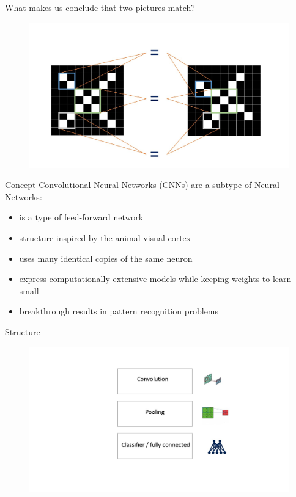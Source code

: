\documentclass[12pt]{beamer}
\begin{document}
\begin{frame}{What makes us conclude that two pictures match?}
\begin{figure}
\includegraphics[width = 0.8\linewidth]{images/features.jpg}
\label{fig:principle}
\end{figure}
\end{frame}


\begin{frame}{Concept}
Convolutional Neural Networks (CNNs) are a subtype of Neural Networks:
  \begin{itemize}
  	\item is a type of feed-forward network
  	\item structure inspired by the animal visual cortex
     \item uses many identical copies of the same neuron
     \item express computationally extensive models while keeping weights to learn small
     \item breakthrough results in pattern recognition problems
     
  \end{itemize}
\end{frame}


\begin{frame}{Structure}
\begin{figure}
\includegraphics[width = 1\linewidth]{images/struct.jpg}
\label{fig:principle}
\end{figure}
\end{frame}
\end{document}
